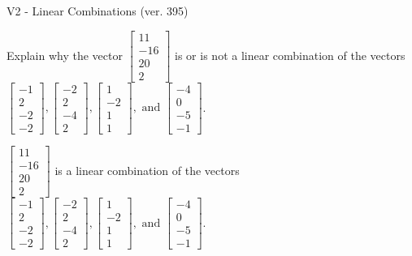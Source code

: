 \begin{exercise}
  \begin{exerciseTitle}V2 - Linear Combinations (ver. 395)\end{exerciseTitle}
  \begin{exerciseStatement}
    Explain why the vector \(\left[\begin{array}{c}
11 \\
-16 \\
20 \\
2
\end{array}\right]\)  is or is not a linear 
	combination of the vectors \(\left[\begin{array}{c}
-1 \\
2 \\
-2 \\
-2
\end{array}\right] , \left[\begin{array}{c}
-2 \\
2 \\
-4 \\
2
\end{array}\right] , \left[\begin{array}{c}
1 \\
-2 \\
1 \\
1
\end{array}\right] , \text{ and } \left[\begin{array}{c}
-4 \\
0 \\
-5 \\
-1
\end{array}\right]\).
	


  \end{exerciseStatement}
  \begin{exerciseAnswer}
   \(\left[\begin{array}{c}
11 \\
-16 \\
20 \\
2
\end{array}\right]\) 
  	 is  
	a linear combination of the vectors \(\left[\begin{array}{c}
-1 \\
2 \\
-2 \\
-2
\end{array}\right] , \left[\begin{array}{c}
-2 \\
2 \\
-4 \\
2
\end{array}\right] , \left[\begin{array}{c}
1 \\
-2 \\
1 \\
1
\end{array}\right] , \text{ and } \left[\begin{array}{c}
-4 \\
0 \\
-5 \\
-1
\end{array}\right]\).


\end{exerciseAnswer}
\end{exercise}

